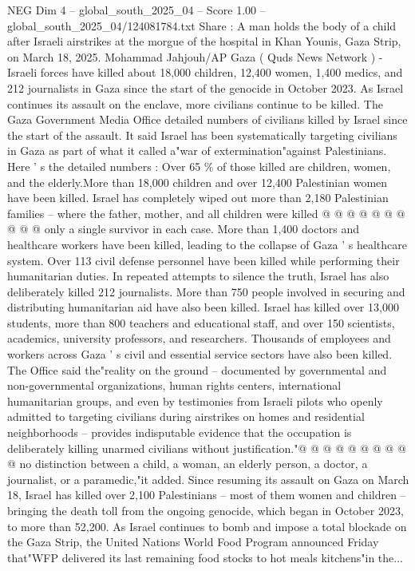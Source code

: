 \begin{textsample}{NEG Dim 4 – global\_south\_2025\_04 – Score 1.00 – global\_south\_2025\_04/124081784.txt}  \label{ex:f4_neg_213}
Share : A man holds the body of a child after Israeli airstrikes at the morgue of the hospital in Khan Younis, Gaza Strip, on March 18, 2025.
Mohammad Jahjouh/AP Gaza ( Quds News Network ) - Israeli forces have killed about 18,000 children, 12,400 women, 1,400 medics, and 212 journalists in Gaza since the start of the genocide in October 2023.
As Israel continues its assault on the enclave, more civilians continue to be killed.
The Gaza Government Media Office detailed numbers of civilians killed by Israel since the start of the assault.
It said Israel has been systematically targeting civilians in Gaza as part of what it called a"war of extermination"against Palestinians.
Here ' s the detailed numbers : Over 65 \% of those killed are children, women, and the elderly.More than 18,000 children and over 12,400 Palestinian women have been killed.
Israel has completely wiped out more than 2,180 Palestinian families -- where the father, mother, and all children were killed @ @ @ @ @ @ @ @ @ @ only a single survivor in each case.
More than 1,400 doctors and healthcare workers have been killed, leading to the collapse of Gaza ' s healthcare system.
Over 113 civil defense personnel have been killed while performing their humanitarian duties.
In repeated attempts to silence the truth, Israel has also deliberately killed 212 journalists.
More than 750 people involved in securing and distributing humanitarian aid have also been killed.
Israel has killed over 13,000 students, more than 800 teachers and educational staff, and over 150 scientists, academics, university professors, and researchers.
Thousands of employees and workers across Gaza ' s civil and essential service sectors have also been killed.
The Office said the"reality on the ground -- documented by governmental and non-governmental organizations, human rights centers, international humanitarian groups, and even by testimonies from Israeli pilots who openly admitted to targeting civilians during airstrikes on homes and residential neighborhoods -- provides indisputable evidence that the occupation is deliberately killing unarmed civilians without justification."@ @ @ @ @ @ @ @ @ @ no distinction between a child, a woman, an elderly person, a doctor, a journalist, or a paramedic,"it added.
Since resuming its assault on Gaza on March 18, Israel has killed over 2,100 Palestinians -- most of them women and children -- bringing the death toll from the ongoing genocide, which began in October 2023, to more than 52,200.
As Israel continues to bomb and impose a total blockade on the Gaza Strip, the United Nations World Food Program announced Friday that"WFP delivered its last remaining food stocks to hot meals kitchens"in the...

\end{textsample}
